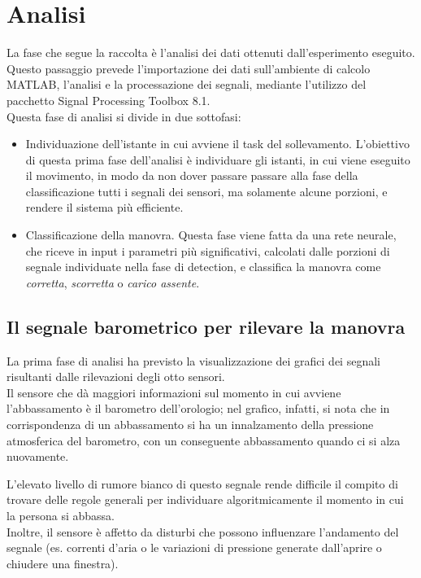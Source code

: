 \documentclass[a4paper]{article}
\begin{document}
\clearpage


\section{Analisi}
La fase che segue la raccolta è l'analisi dei dati ottenuti dall'esperimento eseguito. Questo passaggio prevede l'importazione dei dati sull'ambiente di calcolo MATLAB, l'analisi e la processazione dei segnali, mediante l'utilizzo  del pacchetto Signal Processing Toolbox 8.1. \\
Questa fase di analisi si divide in due sottofasi:
\begin {itemize}
\item Individuazione dell'istante in cui avviene il task del sollevamento. L'obiettivo di questa prima fase dell'analisi è individuare gli istanti, in cui viene eseguito il movimento, in modo da non dover passare  passare alla fase della classificazione tutti i segnali dei sensori, ma solamente alcune porzioni, e rendere il sistema più efficiente.
\item Classificazione della manovra. Questa fase viene fatta da una rete neurale, che riceve in input i parametri più significativi, calcolati dalle porzioni di segnale individuate nella fase di detection, e classifica la manovra come \textit{corretta}, \textit{scorretta} o \textit{carico assente}.
\end{itemize}


\subsection{Il segnale barometrico per rilevare la manovra}
La prima fase di analisi ha previsto la visualizzazione dei grafici dei segnali risultanti dalle rilevazioni degli otto sensori.\\ Il sensore che dà maggiori informazioni sul momento in cui avviene l’abbassamento è il barometro dell'orologio; nel grafico, infatti, si nota che in corrispondenza di un abbassamento si ha un innalzamento della pressione atmosferica del barometro, con un conseguente abbassamento quando ci si alza nuovamente.

L’elevato livello di rumore bianco di questo segnale rende difficile il compito di trovare delle regole generali per individuare algoritmicamente il momento in cui la persona si abbassa. \\
Inoltre, il sensore è affetto da disturbi che possono influenzare l’andamento del segnale (es. correnti d’aria o le variazioni di pressione generate dall’aprire o chiudere una finestra).
\end{document}
